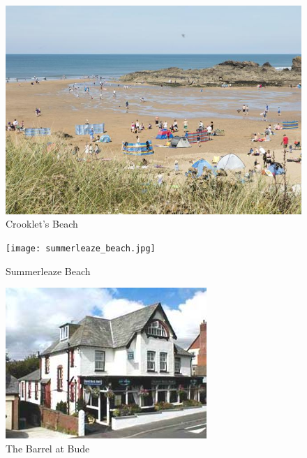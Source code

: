 \documentclass[]{article}
\begin{document}
\begin{figure}
\centering
\includegraphics{crooklets-beach.jpg}
\caption{Crooklet's Beach}
\end{figure}

\begin{figure}
\centering
\texttt{[image: summerleaze\_beach.jpg]}
\caption{Summerleaze Beach}
\end{figure}

\begin{figure}
\centering
\includegraphics{barrel.jpg}
\caption{The Barrel at Bude}
\end{figure}
\end{document}
